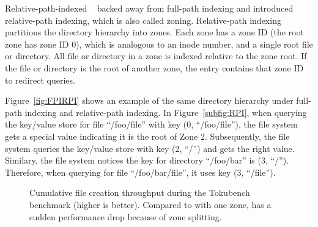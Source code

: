Relative-path-indexed \betrfs~\citep{betrfs2,betrfs2tos} backed away from
full-path indexing and introduced relative-path indexing,
which is also called zoning.
Relative-path indexing partitions the directory hierarchy into zones.
Each zone has a zone ID (the root zone has zone ID 0), which is analogous to an
inode number, and a single root file or directory.
All file or directory in a zone is indexed relative to the zone root.
If the file or directory is the root of another zone, the entry contains that
zone ID to redirect queries.

Figure~\ref{fig:FPIRPI} shows an example of the same directory hierarchy under
full-path indexing and relative-path indexing.
In Figure~\ref{subfig:RPI}, when querying the key/value store for file
``/foo/file'' with key (0, ``/foo/file''), the file system gets a special value
indicating it is the root of Zone 2.
Subsequently, the file system queries the key/value store with key (2, ``/'')
and gets the right value.
Similary, the file system notices the key for directory ``/foo/bar'' is
(3, ``/'').
Therefore, when querying for file ``/foo/bar/file'', it uses key (3, ``/file'').

\begin{figure}[t]
    \centering
    \caption[Zone maintainance cost in TokuBench]{Cumulative file creation
        throughput during the Tokubench benchmark (higher is better).
        Compared to \betrfsThree with one zone, \betrfsThree has a sudden
        performance drop because of zone splitting.}
    \label{fig:tokuzone}
\end{figure}

